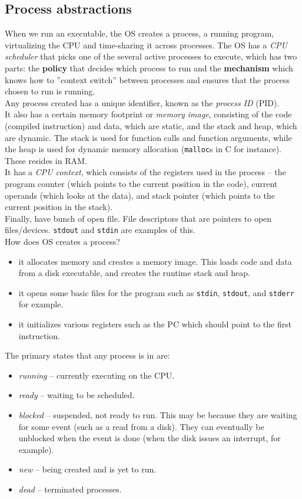 \documentclass{article}
\begin{document}
	\subsection{Process abstractions}

		When we run an executable, the OS creates a process, a running program, virtualizing the CPU and time-sharing it across processes. The OS has a \emph{CPU scheduler} that picks one of the several active processes to execute, which has two parts: the \textbf{policy} that decides which process to run and the \textbf{mechanism} which knows how to ''context switch'' between processes and ensures that the process chosen to run is running.\\

		Any process created has a unique identifier, known as the \emph{process ID} (PID).\\
		It also has a certain memory footprint or \emph{memory image}, consisting of the code (compiled instruction) and data, which are static, and the stack and heap, which are dynamic. The stack is used for function calls and function arguments, while the heap is used for dynamic memory allocation (\texttt{malloc}s in C for instance). These resides in RAM.\\
		It has a \emph{CPU context}, which consists of the registers used in the process -- the program counter (which points to the current position in the code), current operands (which looks at the data), and stack pointer (which points to the current position in the stack).\\
		Finally, have bunch of open file. File descriptors that are pointers to open files/devices. \texttt{stdout} and \texttt{stdin} are examples of this.\\

		How does OS creates a process?
		\begin{itemize}
			\item it allocates memory and creates a memory image. This loads code and data from a disk executable, and creates the runtime stack and heap.
			\item it opens some basic files for the program such as \texttt{stdin}, \texttt{stdout}, and \texttt{stderr} for example.
			\item it initializes various registers such as the PC which should point to the first instruction.
		\end{itemize}

		The primary states that any process is in are:
		\begin{itemize}
			\item \emph{running} -- currently executing on the CPU.
			\item \emph{ready} -- waiting to be scheduled.
			\item \emph{blocked} -- suspended, not ready to run. This may be because they are waiting for some event (such as a read from a disk). They can eventually be unblocked when the event is done (when the disk issues an interrupt, for example).
			\item \emph{new} -- being created and is yet to run.
			\item \emph{dead} -- terminated processes.		
		\end{itemize}
		
\end{document}
